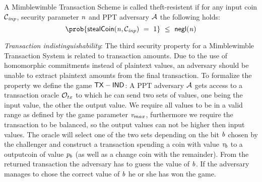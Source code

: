 \begin{center}
\end{center}

\begin{definition}
    A Mimblewimble Transaction Scheme is called theft-resistent if for any input coin $\mathcal{C}_{\mathit{inp}}$, security parameter $\mathit{n}$ and PPT adversary $\mathcal{A}$ the following holds:
    \[ \prob{\procStealCoin{\varN}{\varCoinInp} \opEqNoQ 1 } \opSmEq \funNegl{\varN} \]
\end{definition}

\emph{Transaction indistinguishability}: The third security property for a Mimblewimble Transaction System is related to transaction amounts. Due to the use of homomorphic commitments instead of plaintext values,
an adversary should be unable to extract plaintext amounts from the final transaction. To formalize the property we define the game $\mathsf{TX-IND}$:
A PPT adversary $\mathcal{A}$ gets access to a transaction oracle $\mathcal{O}_{tx}$ to which he can send two sets of values, one being the input value, the other the output value. We require all values to be in
a valid range as defined by the game parameter $\mathit{v}_{max}$, furthermore we require the transaction to be balanced, so the output values can not be higher then input values. The oracle will select one of the two
sets depending on the bit $\mathit{b}$ chosen by the challenger and construct a transaction spending a coin with value $\mathit{v}_b$ to a outputcoin of value $\mathit{p}_b$ (as well as a change coin with the remainder).
From the returned transaction the adversary has to guess the value of $\mathit{b}$.
If the adversary manages to chose the correct value of $\mathit{b}$ he or she has won the game.

